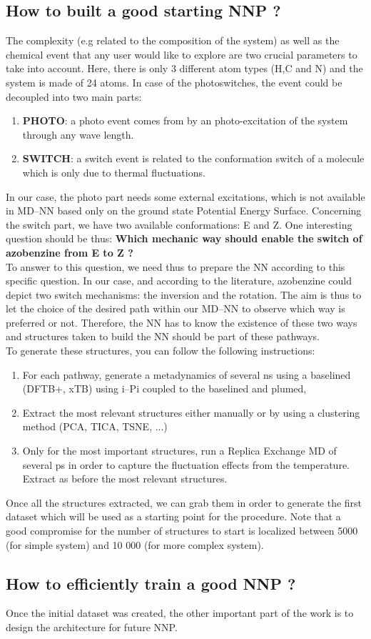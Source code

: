 \documentclass[12pt]{article}
\begin{document}
\subsection{How to built a good starting NNP ?}
The complexity (e.g related to the composition of the system) as well as the chemical event that any user would like to explore are two crucial parameters to take into account. Here, there is only 3 different atom types (H,C and N) and the system is made of 24 atoms. In case of the photoswitches, the event could be decoupled into two main parts:
\begin{enumerate}
    \item \textbf{PHOTO}: a photo event comes from by an photo-excitation of the system through any wave length. 
    \item \textbf{SWITCH}: a switch event is related to the conformation switch of a molecule which is only due to thermal fluctuations.
\end{enumerate}
In our case, the photo part needs some external excitations, which is not available in MD--NN based only on the ground state Potential Energy Surface. Concerning the switch part, we have two available conformations: E and Z. One interesting question should be thus: \textbf{Which mechanic way should enable the switch of azobenzine from E to Z ?} \\
To answer to this question, we need thus to prepare the NN according to this specific question. In our case, and according to the literature, azobenzine could depict two switch mechanisms: the inversion and the rotation. The aim is thus to let the choice of the desired path within our MD--NN to observe which way is preferred or not. Therefore, the NN has to know the existence of these two ways and structures taken to build the NN should be part of these pathways. \\
To generate these structures, you can follow the following instructions:
\begin{enumerate}
    \item For each pathway, generate a metadynamics of several ns using a baselined (DFTB+, xTB) using i--Pi coupled to the baselined and plumed,
    \item Extract the most relevant structures either manually or by using a clustering method (PCA, TICA, TSNE, ...)
    \item Only for the most important structures, run a Replica Exchange MD of several ps in order to capture the fluctuation effects from the temperature. Extract as before the most relevant structures.
\end{enumerate}
Once all the structures extracted, we can grab them in order to generate the first dataset which will be used as a starting point for the procedure. Note that a good compromise for the number of structures to start is localized between 5000 (for simple system) and 10 000 (for more complex system). 
%
\subsection{How to efficiently train a good NNP ?}
Once the initial dataset was created, the other important part of the work is to design the architecture for future NNP.
\end{document}
